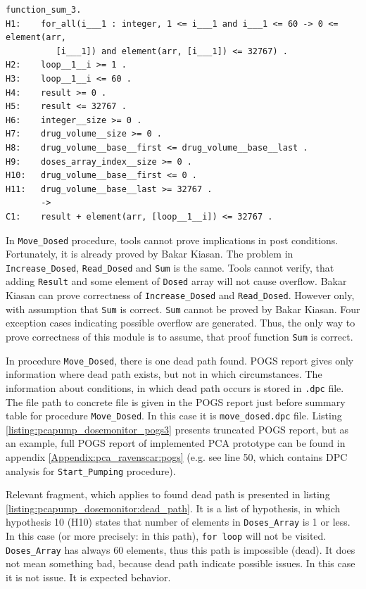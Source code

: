\singlespacing
\begin{lstlisting}[frame=single, gobble=0, caption={Undischarged Verification Condition from sum.siv file}, label={listing:pcapump_undischarged_vc_sum}]
function_sum_3.
H1:    for_all(i___1 : integer, 1 <= i___1 and i___1 <= 60 -> 0 <= element(arr, 
          [i___1]) and element(arr, [i___1]) <= 32767) .
H2:    loop__1__i >= 1 .
H3:    loop__1__i <= 60 .
H4:    result >= 0 .
H5:    result <= 32767 .
H6:    integer__size >= 0 .
H7:    drug_volume__size >= 0 .
H8:    drug_volume__base__first <= drug_volume__base__last .
H9:    doses_array_index__size >= 0 .
H10:   drug_volume__base__first <= 0 .
H11:   drug_volume__base__last >= 32767 .
       ->
C1:    result + element(arr, [loop__1__i]) <= 32767 .
\end{lstlisting}
\doublespacing

In \lstinline{Move_Dosed} procedure, tools cannot prove implications in post conditions. Fortunately, it is already proved by Bakar Kiasan. The problem in \lstinline{Increase_Dosed}, \lstinline{Read_Dosed} and \lstinline{Sum} is the same. Tools cannot verify, that adding \lstinline{Result} and some element of \lstinline{Dosed} array will not cause overflow. Bakar Kiasan can prove correctness of \lstinline{Increase_Dosed} and \lstinline{Read_Dosed}. However only, with assumption that \lstinline{Sum} is correct. \lstinline{Sum} cannot be proved by Bakar Kiasan. Four exception cases indicating possible overflow are generated. Thus, the only way to prove correctness of this module is to assume, that proof function \lstinline{Sum} is correct.

In procedure \lstinline{Move_Dosed}, there is one dead path found. POGS report gives only information where dead path exists, but not in which circumstances. The information about conditions, in which dead path occurs is stored in \lstinline{.dpc} file. The file path to concrete file is given in the POGS report just before summary table for procedure \lstinline{Move_Dosed}. In this case it is \lstinline{move_dosed.dpc} file. Listing \ref{listing:pcapump_dosemonitor_pogs3} presents truncated POGS report, but as an example, full POGS report of implemented PCA prototype can be found in appendix \ref{Appendix:pca_ravenscar:pogs} (e.g. see line 50, which contains DPC analysis for \lstinline{Start_Pumping} procedure). 

Relevant fragment, which applies to found dead path is presented in listing \ref{listing:pcapump_dosemonitor:dead_path}. It is a list of hypothesis, in which hypothesis 10 (H10) states that number of elements in \lstinline{Doses_Array} is 1 or less. In this case (or more precisely: in this path), \lstinline{for loop} will not be visited. \lstinline{Doses_Array} has always 60 elements, thus this path is impossible (dead). It does not mean something bad, because dead path indicate possible issues. In this case it is not issue. It is expected behavior.

